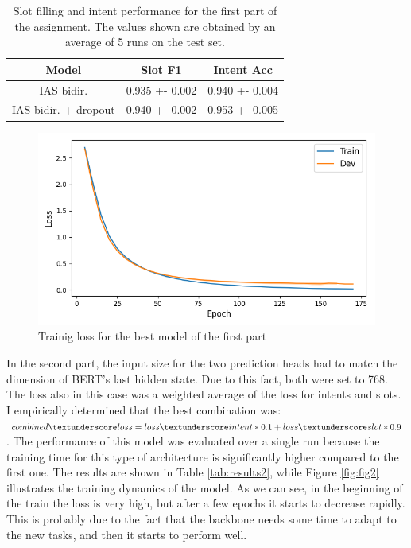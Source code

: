 \documentclass[a4paper]{article}
\begin{document}
\begin{table}[h]
  \centering
  \begin{tabular}{|c|c|c|}
    \hline
    \textbf{Model} & \textbf{Slot F1} & \textbf{Intent Acc} \\
    \hline
    IAS bidir.&  0.935 +- 0.002 & 0.940 +- 0.004 \\
    IAS bidir. + dropout & 0.940 +- 0.002 & 0.953 +- 0.005 \\
    \hline
  \end{tabular}
  \caption{Slot filling and intent performance for the first part of the assignment. The values shown are obtained by an average of 5 runs on the test set.}
  \label{tab:results1}

\end{table}

\begin{figure}[h]
  \includegraphics[width=\linewidth]{./images/plot_1_loss.png}
  \caption{Trainig loss for the best model of the first part}
  \label{fig:fig1}
\end{figure}

In the second part, the input size for the two prediction heads had to match the dimension of BERT’s last hidden state. Due to this fact, both were set to 768.
The loss also in this case was a weighted average of the loss for intents and slots. I empirically determined that the best combination was: \(combined \textunderscore loss = loss \textunderscore intent * 0.1 + loss \textunderscore slot * 0.9\).
The performance of this model was evaluated over a single run because the training time for this type of architecture is significantly higher compared to the first one. The results are shown in Table \ref{tab:results2}, while Figure \ref{fig:fig2} illustrates the training dynamics of the model.
As we can see, in the beginning of the train the loss is very high, but after a few epochs it starts to decrease rapidly. This is probably due to the fact that the backbone needs some time to adapt to the new tasks, and then it starts to perform well.
\end{document}
